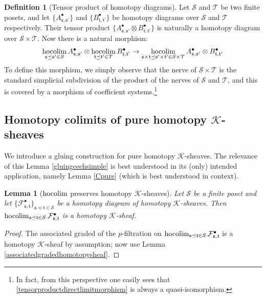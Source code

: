 \documentclass[12pt]{article}
\newtheorem{lemma}[theorem]{Lemma}
\theoremstyle{definition}
\newtheorem{definition}[theorem]{Definition}
\theoremstyle{remark}
\numberwithin{equation}{subsection}
\newcommand{\F}{\mathcal F}
\newcommand{\T}{\mathcal T}
\newcommand{\K}{\mathcal K}
\newcommand{\SSS}{\mathcal S}
\newcommand{\hocolim}{\operatornamewithlimits{hocolim}}
\begin{document}
\begin{definition}[Tensor product of homotopy diagrams]\label{simplicialproduct}
Let $\SSS$ and $\T$ be two finite posets, and let $\{A^\bullet_{\mathfrak s,\mathfrak s'}\}$ and $\{B^\bullet_{\mathfrak t,\mathfrak t'}\}$ be homotopy diagrams over $\SSS$ and $\T$ respectively.  Their tensor product $\{A^\bullet_{\mathfrak s,\mathfrak s'}\otimes B^\bullet_{\mathfrak t,\mathfrak t'}\}$ is naturally a homotopy diagram over $\SSS\times\T$.  Now there is a natural morphism:
\begin{equation}\label{tensorproductdirectlimitmorphism}
\hocolim_{\mathfrak s\preceq\mathfrak s'\in\SSS}A^\bullet_{\mathfrak s,\mathfrak s'}\otimes\hocolim_{\mathfrak t\preceq\mathfrak t'\in\T}B^\bullet_{\mathfrak t,\mathfrak t'}\to\hocolim_{\mathfrak s\times\mathfrak t\preceq\mathfrak s'\times\mathfrak t'\in\SSS\times\T}A^\bullet_{\mathfrak s,\mathfrak s'}\otimes B^\bullet_{\mathfrak t,\mathfrak t'}
\end{equation}
To define this morphism, we simply observe that the nerve of $\SSS\times\T$ is the standard simplicial subdivision of the product of the nerves of $\SSS$ and $\T$, and this is covered by a morphism of coefficient systems.\footnote{In fact, from this perspective one easily sees that \eqref{tensorproductdirectlimitmorphism} is always a quasi-isomorphism.}
\end{definition}

\subsection{Homotopy colimits of pure homotopy \texorpdfstring{$\K$}{K}-sheaves}\label{cechsimplegluingsection}

We introduce a gluing construction for pure homotopy $\K$-sheaves.  The relevance of this Lemma \ref{gluingcechsimple} is best understood in its (only) intended application, namely Lemma \ref{Cpure} (which is best understood in context).

\begin{lemma}[$\hocolim$ preserves homotopy $\K$-sheaves]\label{pihomotopysheaf}
Let $\SSS$ be a finite poset and let $\{\F^\bullet_{\mathfrak s,\mathfrak t}\}_{\mathfrak s\preceq\mathfrak t\in\SSS}$ be a homotopy diagram of homotopy $\K$-sheaves.  Then $\hocolim_{\mathfrak s\preceq\mathfrak t\in\SSS}\F^\bullet_{\mathfrak s,\mathfrak t}$ is a homotopy $\K$-sheaf.
\end{lemma}

\begin{proof}
The associated graded of the $p$-filtration on $\hocolim_{\mathfrak s\preceq\mathfrak t\in\SSS}\F^\bullet_{\mathfrak s,\mathfrak t}$ is a homotopy $\K$-sheaf by assumption; now use Lemma \ref{associatedgradedhomotopysheaf}.
\end{proof}
\end{document}
